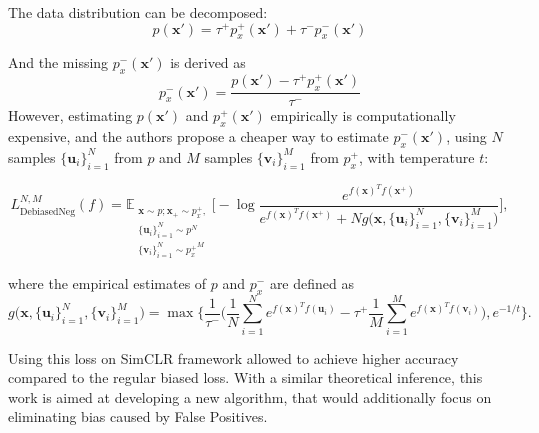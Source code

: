 \documentclass{article}
\begin{document}
The data distribution can be decomposed:
\begin{equation} \label{eq:4}
p(\textbf{x}') = \tau^+ p^+_x(\textbf{x}') + \tau^-p_x^-(\textbf{x}')
\end{equation}

And the missing $p^-_x(\textbf{x}')$ is derived as
\begin{equation} \label{eq:5}
p_x^-(\textbf{x}') = \frac{p(\textbf{x}') - \tau^+ p^+_x(\textbf{x}')}{\tau^-}
\end{equation}
However, estimating $p(\textbf{x}')$ and $p^+_x(\textbf{x}')$ empirically is computationally expensive, and the authors propose a cheaper way to estimate $p^-_x(\textbf{x}')$, using $N$ samples $\{\textbf{u}_i\}_{i=1}^N$ from $p$ and $M$ samples $\{\textbf{v}_i\}_{i=1}^M$ from $p_x^+$, with temperature $t$:

\begin{equation} \label{eq:6}
L_{\text{DebiasedNeg}}^{N, M} (f) = \mathbb{E}_{\substack{\textbf{x} \sim p; \textbf{x}_+ \sim p_x^+,\\ \{\textbf{u}_i\}_{i=1}^N \sim p^N \\ \{\textbf{v}_i\}_{i=1}^N \sim {p_x^+}^M}}  \bigg[ -\log \frac{e^{f(\textbf{x})^T f(\textbf{x}^+)} }{e^{f(\textbf{x})^T f(\textbf{x}^+)} + N g\big(\textbf{x}, \{\textbf{u}_i\}_{i=1}^N, \{\textbf{v}_i\}_{i=1}^M\big)} \bigg],
\end{equation}

where the empirical estimates of $p$ and $p_x^-$ are defined as
\begin{equation} \label{eq:7}
g\big(\textbf{x}, \{\textbf{u}_i\}_{i=1}^N, \{\textbf{v}_i\}_{i=1}^M\big) = \max \bigg\{ \frac{1}{\tau^-}\bigg(\frac{1}{N} \sum \limits_{i=1}^N e^{f(\textbf{x})^T f(\textbf{u}_i)} - \tau^+ \frac{1}{M} \sum \limits_{i=1}^M e^{f(\textbf{x})^T f(\textbf{v}_i)}\bigg), e^{-1/t}\bigg\}.
\end{equation}

Using this loss on SimCLR framework allowed to achieve higher accuracy compared to the regular biased loss. With a similar theoretical inference, this work is aimed at developing a new algorithm, that would additionally focus on eliminating bias caused by False Positives.

\end{document}
